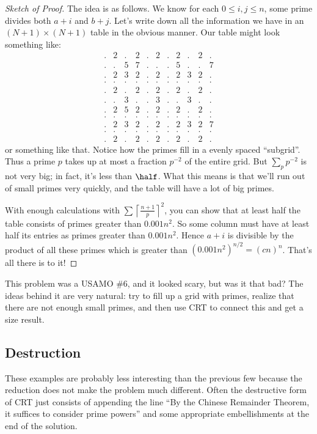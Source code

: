 \documentclass[11pt]{scrartcl}
\begin{document}
\begin{proof}
  [Sketch of Proof]
  The idea is as follows.
  We know for each $0 \le i,j \le n$, some prime divides both $a+i$ and $b+j$.
  Let's write down all the information we have in an $(N+1) \times (N+1)$ table in the obvious manner.
  Our table might look something like:
  \[
    \begin{array}{ccccccccccc}
      . & 2 & . & 2 & . & 2 & . & 2 & . & 2 & . \\
      . & . & 5 & 7 & . & . & . & 5 & . & . & 7 \\
      . & 2 & 3 & 2 & . & 2 & . & 2 & 3 & 2 & . \\
      . & . & . & . & . & . & . & . & . & . & . \\
      . & 2 & . & 2 & . & 2 & . & 2 & . & 2 & . \\
      . & . & 3 & . & . & 3 & . & . & 3 & . & . \\
      . & 2 & 5 & 2 & . & 2 & . & 2 & . & 2 & . \\
      . & . & . & . & . & . & . & . & . & . & . \\
      . & 2 & 3 & 2 & . & 2 & . & 2 & 3 & 2 & 7 \\
      . & . & . & . & . & . & . & . & . & . & . \\
      . & 2 & . & 2 & . & 2 & . & 2 & . & 2 & .
    \end{array}
  \]
  or something like that. Notice how the primes fill in a evenly spaced ``subgrid''.
  Thus a prime $p$ takes up at most a fraction $p^{-2}$ of the entire grid.
  But $\sum_p p^{-2}$ is not very big; in fact, it's less than $\half$.
  What this means is that we'll run out of small primes very quickly,
  and the table will have a lot of big primes.

  With enough calculations with $\sum \left\lceil \frac{n+1}{p} \right\rceil^2$,
  you can show that at least half the table
  consists of primes greater than $0.001n^2$.
  So some column must have at least half its entries
  as primes greater than $0.001n^2$.
  Hence $a+i$ is divisible by the product of all these primes
  which is greater than $(0.001n^2)^{n/2} = (cn)^n$.
  That's all there is to it!
\end{proof}

This problem was a USAMO \#6, and it looked scary, but was it that bad?
The ideas behind it are very natural: try to fill up a grid with primes,
realize that there are not enough small primes, and then use CRT
to connect this and get a size result.

\subsection{Destruction}
These examples are probably less interesting than the previous few
because the reduction does not make the problem much different.
Often the destructive form of CRT just consists of appending the line
``By the Chinese Remainder Theorem, it suffices to consider prime powers''
and some appropriate embellishments at the end of the solution.
\end{document}
